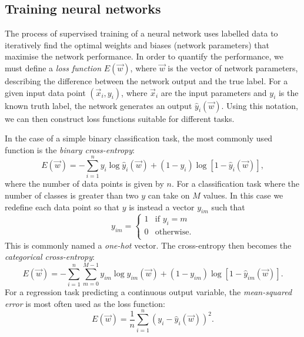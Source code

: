 \subsection{Training neural networks} %
\label{sec:cnn_theory_training} %

The process of supervised training of a neural network uses labelled data to iteratively find the
optimal weights and biases (network parameters) that maximise the network performance. In order to
quantify the performance, we must define a \emph{loss function} $E(\vec{w})$, where $\vec{w}$ is
the vector of network parameters, describing the difference between the network output and the
true label. For a given input data point $(\vec{x}_{i}, y_{i})$, where $\vec{x}_{i}$ are the input
parameters and $y_{i}$ is the known truth label, the network generates an output
$\hat{y}_{i}(\vec{w})$. Using this notation, we can then construct loss functions suitable for
different tasks.

In the case of a simple binary classification task, the most commonly used function is the
\emph{binary cross-entropy}:
\begin{equation} %
    E(\vec{w})=
    -\displaystyle\sum_{i=1}^{n}y_{i}\log\hat{y}_{i}(\vec{w})+
    (1-y_{i})\log[1-\hat{y}_{i}(\vec{w})],
    \label{eq:binary_cross_entropy}
\end{equation}
where the number of data points is given by $n$. For a classification task where the number of
classes is greater than two $y$ can take on $M$ values. In this case we redefine each data point
so that $y$ is instead a vector $y_{im}$ such that
\begin{equation} %
    y_{im}=
    \begin{cases}
        1 & \text{if $y_{i}=m$} \\
        0 & \text{otherwise.}   \\
    \end{cases}
\end{equation}
This is commonly named a \emph{one-hot} vector. The cross-entropy then becomes the
\emph{categorical cross-entropy}:
\begin{equation} %
    E(\vec{w})=
    -\displaystyle\sum_{i=1}^{n}\displaystyle\sum_{m=0}^{M-1}y_{im}\log\hat{y}_{im}
    (\vec{w})+(1-y_{im})\log[1-\hat{y}_{im}(\vec{w})].
    \label{eq:categorical_cross_entropy}
\end{equation}
For a regression task predicting a continuous output variable, the \emph{mean-squared error} is
most often used as the loss function:
\begin{equation} %
    E(\vec{w})=
    \frac{1}{n}\displaystyle\sum_{i=1}^{n}(y_{i}-
    \hat{y}_{i}(\vec{w}))^{2}.
    \label{eq:mse}
\end{equation}


